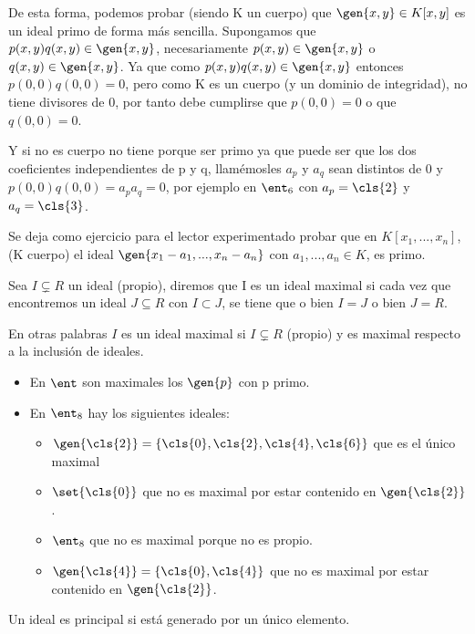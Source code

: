 \obs De esta forma, podemos probar (siendo K un cuerpo) que $\gen{x,y} \in K[x,y]$ es un ideal primo de forma más sencilla. Supongamos que $p(x,y)q(x,y) \in \gen{x,y}$, necesariamente $p(x,y) \in \gen{x,y}$ o $q(x,y) \in \gen{x,y}$. Ya que como $p(x,y)q(x,y) \in \gen{x,y}$ entonces $p(0,0)q(0,0)=0$, pero como K es un cuerpo (y un dominio de integridad), no tiene divisores de 0, por tanto debe cumplirse que $p(0,0)=0$ o que $q(0,0)=0$.

\obs Y si no es cuerpo no tiene porque ser primo ya que puede ser que los dos coeficientes independientes de p y q, llamémosles $a_p$ y $a_q$ sean distintos de 0 y $p(0,0)q(0,0)=a_pa_q=0$, por ejemplo en $\ent_6$ con $a_p=\cls{2}$ y $a_q=\cls{3}$.

Se deja como ejercicio para el lector experimentado probar que en $K[x_1,...,x_n]$, (K cuerpo) el ideal $\gen{x_1-a_1,...,x_n-a_n}$ con $a_1,...,a_n \in K$, es primo.

\begin{defn} \label{def:IdealMaximal}
	Sea $I \subsetneq R$ un ideal (propio), diremos que I es un ideal maximal si cada vez que encontremos un ideal $J ⊆ R$ con $I \subset J$, se tiene que o bien $I=J$ o bien $J=R$.

	En otras palabras $I$ es un ideal maximal si $I \subsetneq R$  (propio) y es maximal respecto a la inclusión de ideales.
\end{defn}

\begin{example}
	\begin{itemize}
		\item En $\ent$ son maximales los $\gen{p}$ con p primo.
		\item En $\ent_8$ hay los siguientes ideales:
		\begin{itemize}
			\item $\gen{\cls{2}}=\{\cls{0},\cls{2},\cls{4},\cls{6} \}$ que es el único maximal
			\item $\set{\cls{0}}$ que no es maximal por estar contenido en $\gen{\cls{2}}$.
			\item $\ent_8$ que no es maximal porque no es propio.
			\item $\gen{\cls{4}}=\{\cls{0},\cls{4} \}$ que no es maximal por estar contenido en $\gen{\cls{2}}$.
		\end{itemize}
	\end{itemize}
\end{example}

\begin{defn}\label{def:ideal_principal}
	Un ideal es principal si está generado por un único elemento.
\end{defn}

